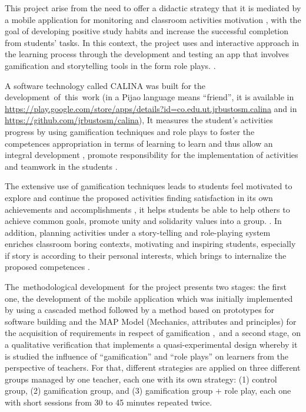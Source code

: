 \begin{singlespace}
This project arise from the need to offer a didactic strategy that it is mediated by a mobile application for
monitoring and classroom activities motivation \cite{SAILER2017371, DAROCHASEIXAS201648}, with the goal of 
developing positive study habits and increase the successful completion from students’ tasks. In this context, 
the project uses and interactive approach in the learning process through the development and testing an app 
that involves gamification and storytelling tools in the form role plays. \cite{rauscher2021comics}.

A software technology called CALINA was built for the development of this work (in a Pijao language means 
``friend'', it is available in \url{https://play.google.com/store/apps/details?id=co.edu.ut.jrbustosm.calina} 
and in \url{https://github.com/jrbustosm/calina}), It measures the student’s activities progress by using 
gamification techniques and role plays to foster the competences appropriation in terms of learning to learn 
and thus allow an integral development \cite{tornero2016ideas, molina_reconfiguracion_2021}, promote 
responsibility for the implementation of activities and teamwork in the students \cite{XU2017}.

The extensive use of gamification techniques leads to students feel motivated to explore and continue the 
proposed activities finding satisfaction in its own achievements and accomplishments 
\cite{Danka2020, MULLINS2020304}, it helps students be able to help others to achieve common goals, promote 
unity and solidarity values into a group. \cite{DING20191}. In addition, planning activities under a 
story-telling and role-playing system enriches classroom boring contexts, motivating and inspiring students, 
especially if story is according to their personal interests, which brings to internalize the proposed 
competences \cite{8190501, Young2015199}.

The methodological development for the project presents two stages: the first one, the development of the
mobile application which was initially implemented by using a cascaded method followed by a method based on
prototypes for software building and the MAP Model (Mechanics, attributes and principles) for the acquisition 
of requirements in respect of gamification \cite{CECHELLA2018}, and a second stage, on a qualitative 
verification that implements a quasi-experimental design whereby it is studied the influence of 
``gamification'' and ``role plays'' on learners from the perspective of teachers. For that, different 
strategies are applied on three different groups managed by one teacher, each one with its own strategy: (1) 
control group, (2) gamification group, and (3) gamification group + role play, each one with short sessions 
from 30 to 45 minutes repeated twice.


\end{singlespace}
